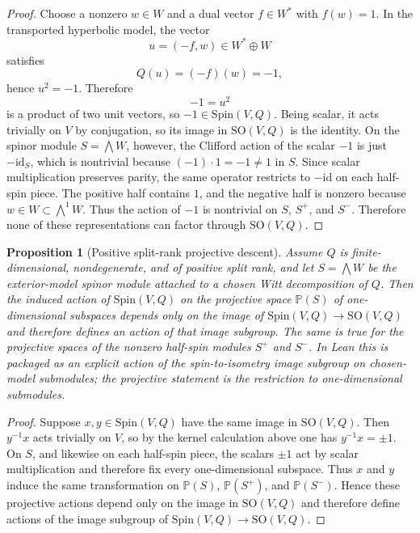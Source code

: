 \documentclass{birkjour}
\theoremstyle{plain}
\newtheorem{proposition}[theorem]{Proposition}
\theoremstyle{definition}
\theoremstyle{remark}
\newcommand{\Spin}{\mathrm{Spin}}
\newcommand{\SO}{\mathrm{SO}}
\begin{document}
\begin{proof}
Choose a nonzero $w\in W$ and a dual vector $f\in W^*$ with $f(w)=1$. In the
transported hyperbolic model, the vector
\[
  u=(-f,w)\in W^*\oplus W
\]
satisfies
\[
  Q(u)=(-f)(w)=-1,
\]
hence $u^2=-1$. Therefore
\[
  -1=u^2
\]
is a product of two unit vectors, so $-1\in \Spin(V,Q)$. Being scalar, it acts
trivially on $V$ by conjugation, so its image in $\SO(V,Q)$ is the identity.
On the spinor module $S=\bigwedge W$, however, the Clifford action of the
scalar $-1$ is just $-\mathrm{id}_S$, which is nontrivial because
$(-1)\cdot 1=-1\neq 1$ in $S$. Since scalar multiplication preserves parity,
the same operator restricts to $-\mathrm{id}$ on each half-spin piece. The
positive half contains $1$, and the negative half is nonzero because
$w\in W\subset \bigwedge^1 W$. Thus the action of $-1$ is nontrivial on $S$,
$S^+$, and $S^-$. Therefore none of these representations can factor through
$\SO(V,Q)$.
\end{proof}

\begin{proposition}[Positive split-rank projective descent]
\label{prop:projective-descent}
Assume $Q$ is finite-dimensional, nondegenerate, and of positive split rank,
and let $S=\bigwedge W$ be the exterior-model spinor module attached to a
chosen Witt decomposition of $Q$. Then the induced action of $\Spin(V,Q)$ on
the projective space $\mathbb{P}(S)$ of one-dimensional subspaces depends only
on the image of $\Spin(V,Q)\to\SO(V,Q)$ and therefore defines an action of
that image subgroup. The same is true for the projective spaces of the nonzero
half-spin modules $S^+$ and $S^-$. In Lean this is packaged as an explicit
action of the spin-to-isometry image subgroup on chosen-model submodules; the
projective statement is the restriction to one-dimensional submodules.
\end{proposition}

\begin{proof}
Suppose $x,y\in \Spin(V,Q)$ have the same image in $\SO(V,Q)$. Then
$y^{-1}x$ acts trivially on $V$, so by the kernel calculation above one has
$y^{-1}x=\pm1$. On $S$, and likewise on each half-spin piece, the scalars
$\pm1$ act by scalar multiplication and therefore fix every one-dimensional
subspace. Thus $x$ and $y$ induce the same transformation on
$\mathbb{P}(S)$, $\mathbb{P}(S^+)$, and $\mathbb{P}(S^-)$. Hence these
projective actions depend only on the image in $\SO(V,Q)$ and therefore define
actions of the image subgroup of $\Spin(V,Q)\to\SO(V,Q)$.
\end{proof}
\end{document}
